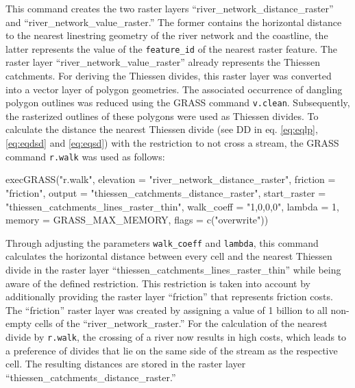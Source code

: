 \documentclass[fleqn,10pt]{wlscirep}
\newenvironment{Shaded}{\begin{snugshade}}{\end{snugshade}}
\newcommand{\AttributeTok}[1]{\textcolor[rgb]{0.77,0.63,0.00}{#1}}
\newcommand{\DecValTok}[1]{\textcolor[rgb]{0.00,0.00,0.81}{#1}}
\newcommand{\FunctionTok}[1]{\textcolor[rgb]{0.00,0.00,0.00}{#1}}
\newcommand{\NormalTok}[1]{#1}
\newcommand{\StringTok}[1]{\textcolor[rgb]{0.31,0.60,0.02}{#1}}
\begin{document}
\normalsize

This command creates the two raster layers ``river\_network\_distance\_raster'' and ``river\_network\_value\_raster.'' The former contains the horizontal distance to the nearest linestring geometry of the river network and the coastline, the latter represents the value of the \texttt{feature\_id} of the nearest raster feature. The raster layer ``river\_network\_value\_raster'' already represents the Thiessen catchments. For deriving the Thiessen divides, this raster layer was converted into a vector layer of polygon geometries. The associated occurrence of dangling polygon outlines was reduced using the GRASS command \texttt{v.clean}. Subsequently, the rasterized outlines of these polygons were used as Thiessen divides. To calculate the distance the nearest Thiessen divide (see DD in eq. \eqref{eq:eqlp}, \eqref{eq:eqdsd} and \eqref{eq:eqsd}) with the restriction to not cross a stream, the GRASS command \texttt{r.walk} was used as follows:

\footnotesize

\begin{Shaded}
\begin{Highlighting}[]
\FunctionTok{execGRASS}\NormalTok{(}\StringTok{"r.walk"}\NormalTok{,}
          \AttributeTok{elevation =} \StringTok{"river\_network\_distance\_raster"}\NormalTok{,}
          \AttributeTok{friction =} \StringTok{"friction"}\NormalTok{,}
          \AttributeTok{output =} \StringTok{"thiessen\_catchments\_distance\_raster"}\NormalTok{,}
          \AttributeTok{start\_raster =} \StringTok{"thiessen\_catchments\_lines\_raster\_thin"}\NormalTok{,}
          \AttributeTok{walk\_coeff =} \StringTok{"1,0,0,0"}\NormalTok{,}
          \AttributeTok{lambda =} \DecValTok{1}\NormalTok{,}
          \AttributeTok{memory =}\NormalTok{ GRASS\_MAX\_MEMORY,}
          \AttributeTok{flags =} \FunctionTok{c}\NormalTok{(}\StringTok{"overwrite"}\NormalTok{))}
\end{Highlighting}
\end{Shaded}

\normalsize

Through adjusting the parameters \texttt{walk\_coeff} and \texttt{lambda}, this command calculates the horizontal distance between every cell and the nearest Thiessen divide in the raster layer ``thiessen\_catchments\_lines\_raster\_thin'' while being aware of the defined restriction. This restriction is taken into account by additionally providing the raster layer ``friction'' that represents friction costs. The ``friction'' raster layer was created by assigning a value of 1 billion to all non-empty cells of the ``river\_network\_raster.'' For the calculation of the nearest divide by \texttt{r.walk}, the crossing of a river now results in high costs, which leads to a preference of divides that lie on the same side of the stream as the respective cell. The resulting distances are stored in the raster layer ``thiessen\_catchments\_distance\_raster.''
\end{document}
